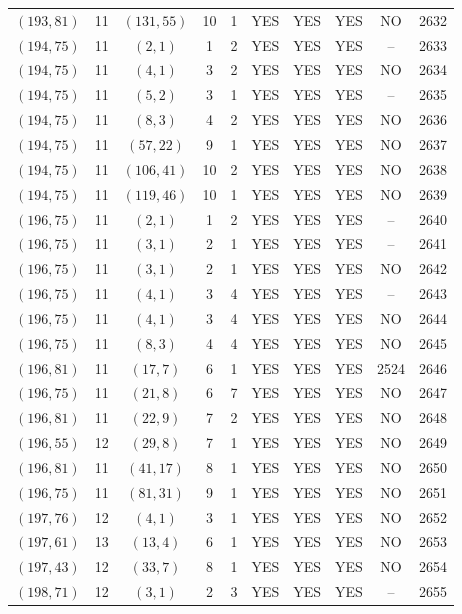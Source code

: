 \begin{longtable}{|c|c|c|c|c|c|c|c|c|c|}
$(193, 81)$ & 11 & $(131, 55)$ & 10 & 1 & YES & YES & YES & NO & 2632\\
$(194, 75)$ & 11 & $(2, 1)$ & 1 & 2 & YES & YES & YES & -- & 2633\\
$(194, 75)$ & 11 & $(4, 1)$ & 3 & 2 & YES & YES & YES & NO & 2634\\
$(194, 75)$ & 11 & $(5, 2)$ & 3 & 1 & YES & YES & YES & -- & 2635\\
$(194, 75)$ & 11 & $(8, 3)$ & 4 & 2 & YES & YES & YES & NO & 2636\\
$(194, 75)$ & 11 & $(57, 22)$ & 9 & 1 & YES & YES & YES & NO & 2637\\
$(194, 75)$ & 11 & $(106, 41)$ & 10 & 2 & YES & YES & YES & NO & 2638\\
$(194, 75)$ & 11 & $(119, 46)$ & 10 & 1 & YES & YES & YES & NO & 2639\\
$(196, 75)$ & 11 & $(2, 1)$ & 1 & 2 & YES & YES & YES & -- & 2640\\
$(196, 75)$ & 11 & $(3, 1)$ & 2 & 1 & YES & YES & YES & -- & 2641\\
$(196, 75)$ & 11 & $(3, 1)$ & 2 & 1 & YES & YES & YES & NO & 2642\\
$(196, 75)$ & 11 & $(4, 1)$ & 3 & 4 & YES & YES & YES & -- & 2643\\
$(196, 75)$ & 11 & $(4, 1)$ & 3 & 4 & YES & YES & YES & NO & 2644\\
$(196, 75)$ & 11 & $(8, 3)$ & 4 & 4 & YES & YES & YES & NO & 2645\\
$(196, 81)$ & 11 & $(17, 7)$ & 6 & 1 & YES & YES & YES & 2524 & 2646\\
$(196, 75)$ & 11 & $(21, 8)$ & 6 & 7 & YES & YES & YES & NO & 2647\\
$(196, 81)$ & 11 & $(22, 9)$ & 7 & 2 & YES & YES & YES & NO & 2648\\
$(196, 55)$ & 12 & $(29, 8)$ & 7 & 1 & YES & YES & YES & NO & 2649\\
$(196, 81)$ & 11 & $(41, 17)$ & 8 & 1 & YES & YES & YES & NO & 2650\\
$(196, 75)$ & 11 & $(81, 31)$ & 9 & 1 & YES & YES & YES & NO & 2651\\
$(197, 76)$ & 12 & $(4, 1)$ & 3 & 1 & YES & YES & YES & NO & 2652\\
$(197, 61)$ & 13 & $(13, 4)$ & 6 & 1 & YES & YES & YES & NO & 2653\\
$(197, 43)$ & 12 & $(33, 7)$ & 8 & 1 & YES & YES & YES & NO & 2654\\
$(198, 71)$ & 12 & $(3, 1)$ & 2 & 3 & YES & YES & YES & -- & 2655\\

\end{longtable}
